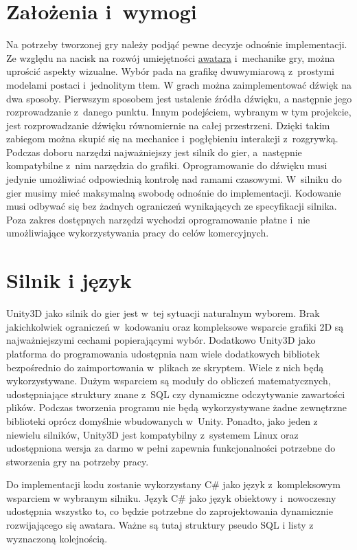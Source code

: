 \documentclass[brudnopis]{xmgr}
\begin{document}
\section{Założenia i~wymogi\label{s:dsssl}}
Na potrzeby tworzonej gry należy podjąć pewne
decyzje odnośnie implementacji. Ze względu na nacisk na rozwój umiejętności \hyperref[slownik]{awatara} i~mechanike gry, można uprościć aspekty wizualne. Wybór pada na grafikę 
dwuwymiarową z~prostymi modelami postaci i~jednolitym tłem. W grach można zaimplementować dźwięk na dwa sposoby. Pierwszym sposobem jest ustalenie źródła dźwięku, a następnie jego rozprowadzanie z~danego punktu. Innym podejściem, wybranym w tym projekcie, jest rozprowadzanie dźwięku równomiernie na całej przestrzeni. Dzięki takim zabiegom
można skupić się na mechanice i~pogłębieniu interakcji z~rozgrywką.
Podczas doboru narzędzi najważniejszy jest silnik do gier, a~następnie
kompatybilne z~nim narzędzia do grafiki. Oprogramowanie do dźwięku musi
jedynie umożliwiać odpowiednią kontrolę nad ramami czasowymi. W~silniku
do gier musimy mieć maksymalną swobodę odnośnie do implementacji. Kodowanie
musi odbywać się bez żadnych ograniczeń wynikających ze specyfikacji
silnika.
Poza zakres dostępnych narzędzi wychodzi oprogramowanie płatne i~nie
umożliwiające wykorzystywania pracy do celów komercyjnych.
\section{Silnik i język\label{s:xsl}}
Unity3D jako silnik do gier jest w~tej sytuacji naturalnym wyborem. Brak jakichkolwiek ograniczeń w~kodowaniu oraz kompleksowe wsparcie grafiki 2D są najważniejszymi cechami popierającymi wybór. Dodatkowo Unity3D jako platforma do programowania udostępnia nam wiele dodatkowych
bibliotek bezpośrednio do zaimportowania w~plikach ze skryptem. Wiele z nich będą wykorzystywane. Dużym wsparciem są moduły do obliczeń matematycznych, udostępniające struktury znane z~SQL czy dynamiczne odczytywanie zawartości plików. Podczas tworzenia programu nie będą wykorzystywane żadne zewnętrzne biblioteki oprócz domyślnie wbudowanych w~Unity. Ponadto, jako jeden z niewielu silników, Unity3D jest kompatybilny z~systemem Linux oraz udostępniona wersja za darmo w pełni zapewnia funkcjonalności potrzebne do stworzenia gry na potrzeby pracy.

Do implementacji kodu zostanie wykorzystany C\# jako język z~kompleksowym wsparciem w wybranym silniku. Język C\# jako język obiektowy i~nowoczesny
udostępnia wszystko to, co będzie potrzebne do zaprojektowania dynamicznie rozwijającego się awatara. Ważne są tutaj struktury pseudo SQL i listy z wyznaczoną kolejnością.
\end{document}
